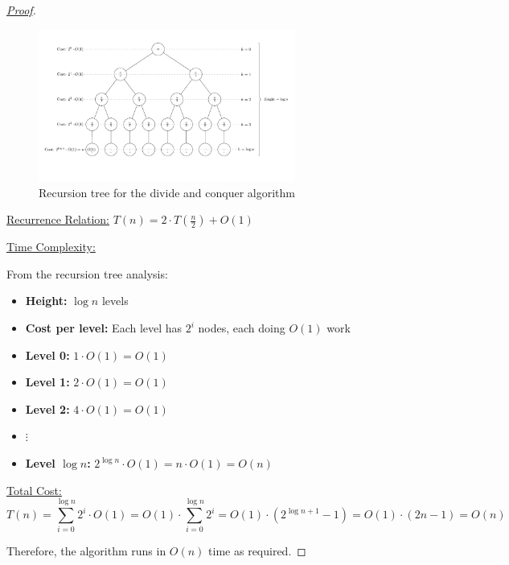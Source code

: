 \documentclass[11pt]{article}
\begin{document}
\begin{enumerate}
\begin{proof}[\underline{Proof}]
\begin{figure}[h]
\centering
\includegraphics[width=0.75\textwidth]{p4.pdf}
\caption{Recursion tree for the divide and conquer algorithm}
\end{figure}

\newpage

\underline{Recurrence Relation:} $T(n) = 2 \cdot T(\frac{n}{2}) + O(1)$

\underline{Time Complexity:}


From the recursion tree analysis:
\begin{itemize}
    \item \textbf{Height:} $\log n$ levels
    \item \textbf{Cost per level:} Each level has $2^i$ nodes, each doing $O(1)$ work
    \item \textbf{Level 0:} $1 \cdot O(1) = O(1)$
    \item \textbf{Level 1:} $2 \cdot O(1) = O(1)$
    \item \textbf{Level 2:} $4 \cdot O(1) = O(1)$
    \item $\vdots$
    \item \textbf{Level $\log n$:} $2^{\log n} \cdot O(1) = n \cdot O(1) = O(n)$
\end{itemize}

\underline{Total Cost:} 
$$T(n) = \sum_{i=0}^{\log n} 2^i \cdot O(1) = O(1) \cdot \sum_{i=0}^{\log n} 2^i = O(1) \cdot (2^{\log n + 1} - 1) = O(1) \cdot (2n - 1) = O(n)$$

Therefore, the algorithm runs in $O(n)$ time as required.

\end{proof}

\end{enumerate}
\end{document}
